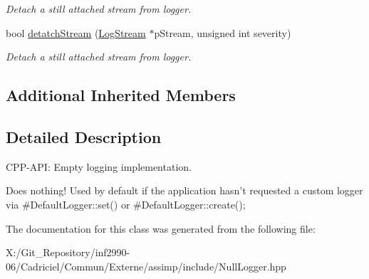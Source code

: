 \begin{DoxyCompactItemize}
\begin{DoxyCompactList}\small\item\em Detach a still attached stream from logger. \end{DoxyCompactList}\item 
\hypertarget{class_assimp_1_1_null_logger_ab49b14a0045aab73b813a448b5aa77b4}{bool \hyperlink{class_assimp_1_1_null_logger_ab49b14a0045aab73b813a448b5aa77b4}{detatch\-Stream} (\hyperlink{class_assimp_1_1_log_stream}{Log\-Stream} $\ast$p\-Stream, unsigned int severity)}\label{class_assimp_1_1_null_logger_ab49b14a0045aab73b813a448b5aa77b4}

\begin{DoxyCompactList}\small\item\em Detach a still attached stream from logger. \end{DoxyCompactList}\end{DoxyCompactItemize}
\subsection*{Additional Inherited Members}


\subsection{Detailed Description}
C\-P\-P-\/\-A\-P\-I\-: Empty logging implementation. 

Does nothing! Used by default if the application hasn't requested a custom logger via \#\-Default\-Logger\-::set() or \#\-Default\-Logger\-::create(); 

The documentation for this class was generated from the following file\-:\begin{DoxyCompactItemize}
\item 
X\-:/\-Git\-\_\-\-Repository/inf2990-\/06/\-Cadriciel/\-Commun/\-Externe/assimp/include/Null\-Logger.\-hpp\end{DoxyCompactItemize}
